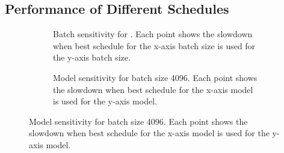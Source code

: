 \subsection{Performance of Different Schedules} 

\begin{figure}[]
  \centering
  \begin{subfigure}[b]{.3\textwidth}
    \caption{\label{fig:sensitivitya} Batch sensitivity for . Each point shows the slowdown when best schedule for the 
    x-axis batch size is used for the y-axis batch size.}
  \end{subfigure}
  \begin{subfigure}[b]{.3\textwidth}
    \caption{\label{fig:sensitivityb} Model sensitivity for batch size 4096. Each point shows the slowdown when best schedule for the
    x-axis model is used for the y-axis model.}
  \end{subfigure}
\end{figure}

